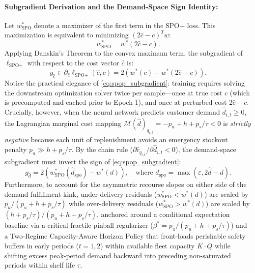 \documentclass[11pt,a4paper]{article}
\theoremstyle{definition}
\theoremstyle{remark}
\begin{document}
\paragraph{Subgradient Derivation and the Demand-Space Sign Identity:}
Let $w_{\text{SPO}}^*$ denote a maximizer of the first term in the SPO+ loss. This maximization is equivalent to minimizing $(2\hat{c} - c)^T w$:
\begin{equation*}
    w_{\text{SPO}}^* = w^*(2\hat{c} - c).
\end{equation*}
Applying Danskin's Theorem to the convex maximum term, the subgradient of $\ell_{\text{SPO}+}$ with respect to the cost vector $\hat{c}$ is:
\begin{equation}
    g_{\hat{c}} \in \partial_{\hat{c}} \ell_{\text{SPO}+}(\hat{c}, c) = 2 \left( w^*(c) - w^*(2\hat{c} - c) \right). \label{eq:spop_subgradient}
\end{equation}
Notice the practical elegance of \eqref{eq:spop_subgradient}: training requires solving the downstream optimization solver twice per sample—once at true cost $c$ (which is precomputed and cached prior to Epoch 1), and once at perturbed cost $2\hat{c} - c$. Crucially, however, when the neural network predicts customer demand $\hat{d}_{i,t} \ge 0$, the Lagrangian marginal cost mapping $\mathcal{M}(\hat{d})_{q_{i,t}} = -p_u + h + p_s/\tau < 0$ is \textit{strictly negative} because each unit of replenishment avoids an emergency stockout penalty $p_u \gg h + p_s/\tau$. By the chain rule ($\partial \hat{c}_{q_{i,t}} / \partial \hat{d}_{i,t} < 0$), the demand-space subgradient must invert the sign of \eqref{eq:spop_subgradient}:
\begin{equation}
    g_{\hat{d}} = 2 \left( w_{\text{SPO}}^*(\hat{d}_{\text{spo}}) - w^*(d) \right), \quad \text{where } \hat{d}_{\text{spo}} = \max(\varepsilon, 2\hat{d} - d). \label{eq:demand_subgradient}
\end{equation}
Furthermore, to account for the asymmetric recourse slopes on either side of the demand-fulfillment kink, under-delivery residuals ($w_{\text{SPO}}^* < w^*(d)$) are scaled by $p_u / (p_u + h + p_s/\tau)$ while over-delivery residuals ($w_{\text{SPO}}^* > w^*(d)$) are scaled by $(h + p_s/\tau) / (p_u + h + p_s/\tau)$, anchored around a conditional expectation baseline via a critical-fractile pinball regularizer ($\beta^* = p_u / (p_u + h + p_s/\tau)$) and a Two-Regime Capacity-Aware Horizon Policy that front-loads perishable safety buffers in early periods ($t=1, 2$) within available fleet capacity $K \cdot Q$ while shifting excess peak-period demand backward into preceding non-saturated periods within shelf life $\tau$.
\end{document}
